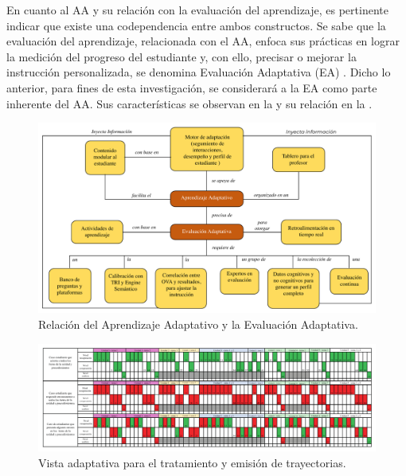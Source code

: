 \documentclass[spanish]{textolivre}
\begin{document}
En cuanto al AA y su relación con la evaluación del aprendizaje, es pertinente indicar que existe una codependencia entre ambos constructos. Se sabe que la evaluación del aprendizaje, relacionada con el AA, enfoca sus prácticas en lograr la medición del progreso del estudiante y, con ello, precisar o mejorar la instrucción personalizada, se denomina Evaluación Adaptativa (EA) \cite{edutrends2014}.%
Dicho lo anterior, para fines de esta investigación, se considerará a la EA como parte inherente del AA. Sus características se observan en la  y su relación en la .

\begin{figure}[h!]
   \centering
   \includegraphics[width=\textwidth]{fig-01.pdf}
   \caption{Relación del Aprendizaje Adaptativo y la Evaluación Adaptativa.}
   \label{fig:01}
\end{figure}

\begin{figure}[h!]
   \centering
   \includegraphics[width=\textwidth]{fig-02.pdf}
   \caption{Vista adaptativa para el tratamiento y emisión de trayectorias.}
   \label{fig:02}
\end{figure} 
\end{document}

